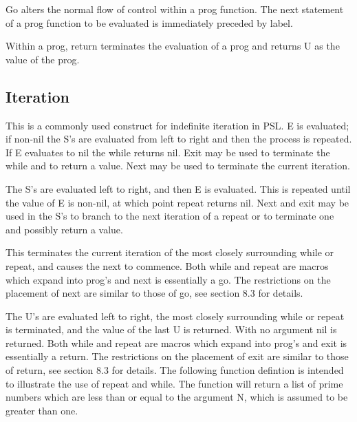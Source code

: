 {    Go alters the normal flow of control within a prog function.
    The next statement of a prog function  to  be  evaluated  is
    immediately preceded by label.
}

{    Within  a  prog,  return terminates the evaluation of a prog
    and returns U as the value of the prog.
}
\subsection{Iteration}

{    This is a commonly used construct for  indefinite  iteration
    in  PSL.    E is evaluated; if non-nil the S's are evaluated
    from left to right and then the process is repeated.   If  E
    evaluates to nil the while returns nil.  Exit may be used to
    terminate the while and to return a value.  Next may be used
    to terminate the current iteration.
}

{    The  S's  are  evaluated  left  to  right,  and  then  E  is
    evaluated.  This  is  repeated  until  the  value  of  E  is
    non-nil,  at  which point repeat returns nil.  Next and exit
    may be used in the S's to branch to the next iteration of  a
    repeat or to terminate one and possibly return a value.
}

{    This  terminates  the  current iteration of the most closely
    surrounding  while  or  repeat,  and  causes  the  next   to
    commence.    Both  while  and repeat are macros which expand
    into prog's and next is essentially a go.  The  restrictions
    on  the  placement  of  next are similar to those of go, see
    section 8.3 for details.
}

{    The U's are  evaluated  left  to  right,  the  most  closely
    surrounding  while or repeat is terminated, and the value of
    the last U is returned.  With no argument nil  is  returned.
    Both  while  and  repeat are macros which expand into prog's
    and  exit is essentially a return.  The restrictions on  the
    placement  of  exit  are  similar  to  those  of return, see
    section 8.3 for details.
}
  The following function defintion is intended to illustrate the
use of repeat and while.  The function will  return  a  list  of
prime  numbers  which  are less than or equal to the argument N,
which is assumed to be greater than one.

